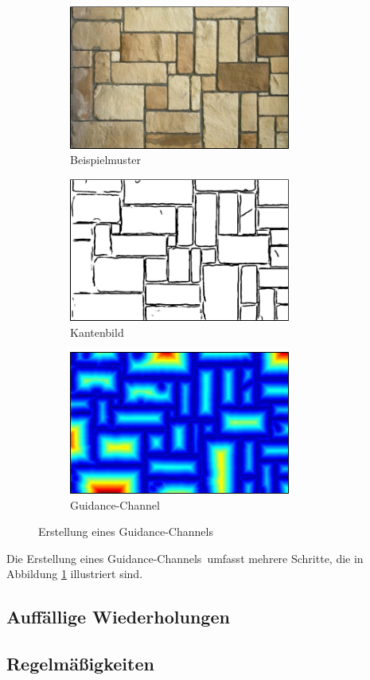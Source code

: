 \begin{figure}
	\centering
	\begin{subfigure}{0.3\textwidth}
		\centering
		\includegraphics[width=0.8\textwidth]{images/guidance-channel-1}
		\caption{Beispielmuster}
	\end{subfigure}
	\hfill
	\begin{subfigure}{0.3\textwidth}
		\centering
		\includegraphics[width=0.8\textwidth]{images/guidance-channel-2}
		\caption{Kantenbild}
	\end{subfigure}
	\hfill
	\begin{subfigure}{0.3\textwidth}
		\centering
		\includegraphics[width=0.8\textwidth]{images/guidance-channel-3}
		\caption{\glqq Guidance-Channel\grqq}
	\end{subfigure}
	
	\caption{Erstellung eines \glqq Guidance-Channels\grqq}
	\label{guidance-channel}
\end{figure}

Die Erstellung eines \glqq Guidance-Channels\grqq \ umfasst mehrere Schritte, die in Abbildung \ref{guidance-channel} illustriert sind.

\subsection{Auffällige Wiederholungen}

\subsection{Regelmäßigkeiten}